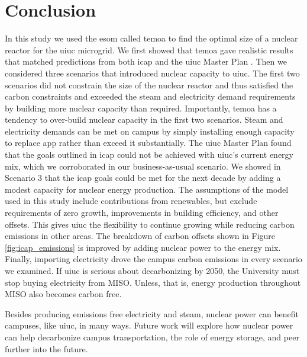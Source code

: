 \section{Conclusion}

In this study we used the \gls{esom} called \gls{temoa} to find the optimal
size of a nuclear reactor for the \gls{uiuc} microgrid. We first showed that
\gls{temoa} gave realistic results that matched predictions from both \gls{icap}
and the \gls{uiuc} Master Plan \cite{isee_illinois_2015, affiliated_engineers_inc_utilities_2015}.
Then we considered three scenarios that introduced nuclear capacity to
\gls{uiuc}. The first two scenarios did not constrain the size of the nuclear
reactor and thus satisfied the carbon constraints and exceeded the steam
and electricity demand requirements by building more nuclear capacity than
required. Importantly, \gls{temoa} has a tendency to over-build nuclear capacity
in the first two scenarios. Steam and electricity demands can be met on campus
by simply installing enough capacity to replace \gls{app} rather than exceed it
substantially.
The \gls{uiuc} Master Plan found that the goals outlined in \gls{icap} could
not be achieved with \gls{uiuc}'s current energy mix, which we corroborated in
our business-as-usual scenario. We showed in Scenario 3 that the \gls{icap}
goals could be met for the next decade by adding a modest capacity for nuclear
energy production. The assumptions of the model used in this study include
contributions from renewables, but exclude requirements of zero growth,
improvements in building efficiency, and other offsets. This gives \gls{uiuc}
the flexibility to continue growing while reducing carbon emissions in other
areas. The breakdown of carbon offsets shown in Figure \ref{fig:icap_emissions}
is improved by adding nuclear power to the energy mix.
Finally, importing electricity drove the campus carbon emissions in every
scenario we examined. If \gls{uiuc} is serious about decarbonizing by 2050, the
University must stop buying electricity from MISO. Unless, that is, energy
production throughout MISO also becomes carbon free.

Besides producing emissions free electricity and steam, nuclear power can
benefit campuses, like \gls{uiuc}, in many ways. Future work will explore how
nuclear power can help decarbonize campus transportation, the role of energy
storage, and peer further into the future.
